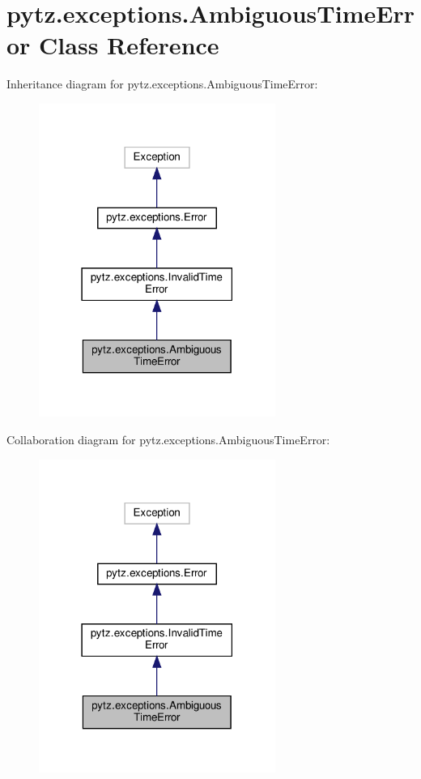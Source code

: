 \hypertarget{classpytz_1_1exceptions_1_1AmbiguousTimeError}{}\section{pytz.\+exceptions.\+Ambiguous\+Time\+Error Class Reference}
\label{classpytz_1_1exceptions_1_1AmbiguousTimeError}


Inheritance diagram for pytz.\+exceptions.\+Ambiguous\+Time\+Error\+:
\nopagebreak
\begin{figure}[H]
\begin{center}
\leavevmode
\includegraphics[width=219pt]{classpytz_1_1exceptions_1_1AmbiguousTimeError__inherit__graph}
\end{center}
\end{figure}


Collaboration diagram for pytz.\+exceptions.\+Ambiguous\+Time\+Error\+:
\nopagebreak
\begin{figure}[H]
\begin{center}
\leavevmode
\includegraphics[width=219pt]{classpytz_1_1exceptions_1_1AmbiguousTimeError__coll__graph}
\end{center}
\end{figure}


